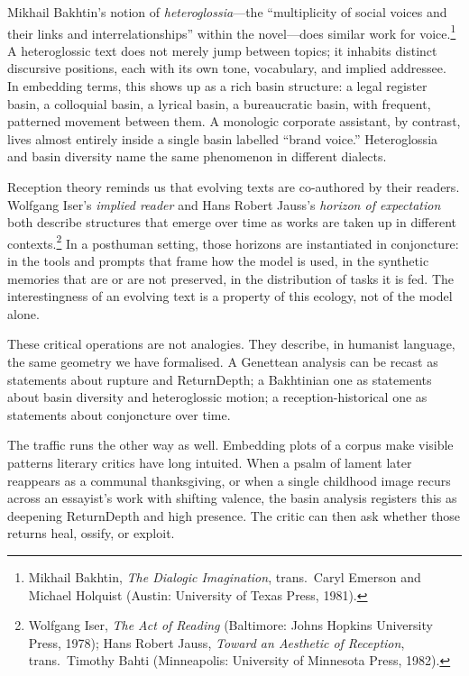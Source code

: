 \documentclass[12pt,a4paper]{article}
\begin{document}
Mikhail Bakhtin's notion of \emph{heteroglossia}---the ``multiplicity of social voices and their links and interrelationships'' within the novel---does similar work for voice.\footnote{Mikhail Bakhtin, \emph{The Dialogic Imagination}, trans.\ Caryl Emerson and Michael Holquist (Austin: University of Texas Press, 1981).} A heteroglossic text does not merely jump between topics; it inhabits distinct discursive positions, each with its own tone, vocabulary, and implied addressee. In embedding terms, this shows up as a rich basin structure: a legal register basin, a colloquial basin, a lyrical basin, a bureaucratic basin, with frequent, patterned movement between them. A monologic corporate assistant, by contrast, lives almost entirely inside a single basin labelled ``brand voice.'' Heteroglossia and basin diversity name the same phenomenon in different dialects.

Reception theory reminds us that evolving texts are co-authored by their readers. Wolfgang Iser's \emph{implied reader} and Hans Robert Jauss's \emph{horizon of expectation} both describe structures that emerge over time as works are taken up in different contexts.\footnote{Wolfgang Iser, \emph{The Act of Reading} (Baltimore: Johns Hopkins University Press, 1978); Hans Robert Jauss, \emph{Toward an Aesthetic of Reception}, trans.\ Timothy Bahti (Minneapolis: University of Minnesota Press, 1982).} In a posthuman setting, those horizons are instantiated in conjoncture: in the tools and prompts that frame how the model is used, in the synthetic memories that are or are not preserved, in the distribution of tasks it is fed. The interestingness of an evolving text is a property of this ecology, not of the model alone.

These critical operations are not analogies. They describe, in humanist language, the same geometry we have formalised. A Genettean analysis can be recast as statements about rupture and ReturnDepth; a Bakhtinian one as statements about basin diversity and heteroglossic motion; a reception-historical one as statements about conjoncture over time.

The traffic runs the other way as well. Embedding plots of a corpus make visible patterns literary critics have long intuited. When a psalm of lament later reappears as a communal thanksgiving, or when a single childhood image recurs across an essayist's work with shifting valence, the basin analysis registers this as deepening ReturnDepth and high presence. The critic can then ask whether those returns heal, ossify, or exploit.
\end{document}
